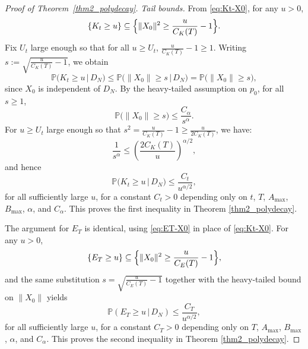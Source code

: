 \documentclass[10pt,a4paper]{amsart}
\begin{document}
\begin{proof}[Proof of Theorem~\ref{thm2_polydecay}]
\medskip\noindent
\emph{Tail bounds.}
From \eqref{eq:Kt-X0}, for any \(u > 0\),
\[
\{K_t \ge u\}
\subseteq \Bigl\{\|X_0\|^2 \ge \frac{u}{C_K(T)} - 1\Bigr\}.
\]
Fix \(U_t\) large enough so that for all \(u \ge U_t\),
\(\frac{u}{C_K(T)} - 1 \ge 1\). Writing \(s := \sqrt{\frac{u}{C_K(T)} - 1}\),
we obtain
\[
\mathbb{P}\bigl(K_t \ge u \,\big|\, D_N\bigr)
\le \mathbb{P}\bigl(\|X_0\| \ge s \,\big|\, D_N\bigr)
= \mathbb{P}\bigl(\|X_0\| \ge s\bigr),
\]
since \(X_0\) is independent of \(D_N\). By the heavy-tailed assumption on \(p_0\),
for all \(s \ge 1\),
\[
\mathbb{P}\bigl(\|X_0\| \ge s\bigr)
\le \frac{C_\alpha}{s^\alpha}.
\]
For $u \ge U_t$ large enough so that $s^2 = \frac{u}{C_K(T)} - 1 \ge \frac{u}{2C_K(T)}$,
we have:
\[
\frac{1}{s^\alpha} \le \left(\frac{2C_K(T)}{u}\right)^{\alpha/2},
\]
and hence
\[
\mathbb{P}\bigl(K_t \ge u \,\big|\, D_N\bigr)
\le \frac{C_t}{u^{\alpha/2}},
\]
for all sufficiently large $u$, for a constant $C_t>0$ depending only on $t$, $T$, $A_{\max}$, $B_{\max}$, $\alpha$, and $C_\alpha$. This proves the first inequality in Theorem \ref{thm2_polydecay}.

The argument for $E_T$ is identical, using \eqref{eq:ET-X0} in place of
\eqref{eq:Kt-X0}. For any $u > 0$,
\[
\{E_T \ge u\}
\subseteq \Bigl\{\|X_0\|^2 \ge \frac{u}{C_E(T)} - 1\Bigr\},
\]
and the same substitution $s = \sqrt{\frac{u}{C_E(T)} - 1}$ together with the heavy-tailed bound on $\|X_0\|$ yields
\[
\mathbb{P}(E_T \ge u \,\big|\, D_N)
\le \frac{C_T}{u^{\alpha/2}},
\]
for all sufficiently large $u$, for a constant $C_T>0$ depending only on $T$, $A_{\max}$, $B_{\max}$, $\alpha$, and $C_\alpha$. This proves the second inequality in Theorem \ref{thm2_polydecay}.

\end{proof}
\end{document}
